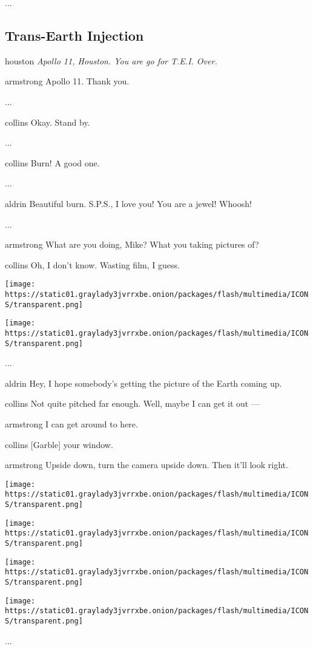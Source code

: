 ...

\hypertarget{-trans-earth-injection-}{%
\subsection{ Trans-Earth Injection }\label{-trans-earth-injection-}}

houston \emph{Apollo 11, Houston. You are go for T.E.I. Over.}

armstrong Apollo 11. Thank you.

...

collins Okay. Stand by.

...

collins Burn! A good one.

...

aldrin Beautiful burn. S.P.S., I love you! You are a jewel! Whoosh!

...

armstrong What are you doing, Mike? What you taking pictures of?

collins Oh, I don't know. Wasting film, I guess.

\texttt{[image: https://static01.graylady3jvrrxbe.onion/packages/flash/multimedia/ICONS/transparent.png]}

\texttt{[image: https://static01.graylady3jvrrxbe.onion/packages/flash/multimedia/ICONS/transparent.png]}

...

aldrin Hey, I hope somebody's getting the picture of the Earth coming
up.

collins Not quite pitched far enough. Well, maybe I can get it out ---

armstrong I can get around to here.

collins {[}Garble{]} your window.

armstrong Upside down, turn the camera upside down. Then it'll look
right.

\texttt{[image: https://static01.graylady3jvrrxbe.onion/packages/flash/multimedia/ICONS/transparent.png]}

\texttt{[image: https://static01.graylady3jvrrxbe.onion/packages/flash/multimedia/ICONS/transparent.png]}

\texttt{[image: https://static01.graylady3jvrrxbe.onion/packages/flash/multimedia/ICONS/transparent.png]}

\texttt{[image: https://static01.graylady3jvrrxbe.onion/packages/flash/multimedia/ICONS/transparent.png]}

...

